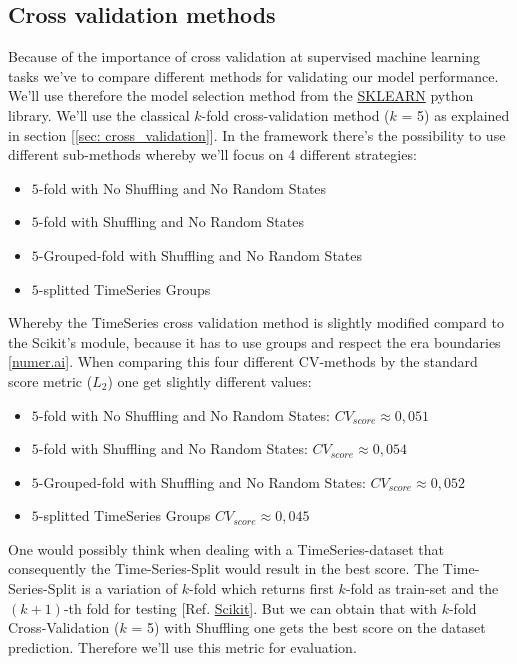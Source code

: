 \documentclass[12pt, a4paper]{article}
\begin{document}
\subsection{Cross validation methods}
Because of the importance of cross validation at supervised machine learning tasks we've to compare different methods for validating our model performance. 
We'll use therefore the model selection method from the \href{https://scikit-learn.org/stable/modules/generated/sklearn.model_selection.KFold.html}{SKLEARN} python library. We'll use the classical $k$-fold cross-validation method ($k$ = 5) as explained in section [\ref{sec: cross_validation}]. In the framework there's the possibility to use different sub-methods whereby we'll focus on 4 different strategies:
\begin{itemize}
    \item $5$-fold with No Shuffling and No Random States
    \item $5$-fold with Shuffling and No Random States
    \item $5$-Grouped-fold with Shuffling and No Random States
    \item $5$-splitted TimeSeries Groups
\end{itemize}
Whereby the TimeSeries cross validation method is slightly modified compard to the Scikit's module, because it has to use groups and respect the era boundaries [\href{https://numer.ai}{numer.ai}].
When comparing this four different CV-methods by the standard score metric ($L_2$) one get slightly different values:
\begin{itemize}
    \item $5$-fold with No Shuffling and No Random States: $CV_{score} \approx 0,051$
    \item $5$-fold with Shuffling and No Random States: $CV_{score} \approx 0,054$
    \item $5$-Grouped-fold with Shuffling and No Random States: $CV_{score} \approx 0,052$
    \item $5$-splitted TimeSeries Groups $CV_{score} \approx 0,045$
\end{itemize}
One would possibly think when dealing with a TimeSeries-dataset that consequently the Time-Series-Split would result in the best score. The Time-Series-Split is a variation of $k$-fold which returns first $k$-fold as train-set and the $(k + 1)$-th fold for testing [Ref. \href{https://scikit-learn.org/stable/modules/cross_validation.html#k-fold}{Scikit}]. But we can obtain that with $k$-fold Cross-Validation ($k$ = 5) with Shuffling one gets the best score on the dataset prediction. Therefore we'll use this metric for evaluation.
\end{document}
